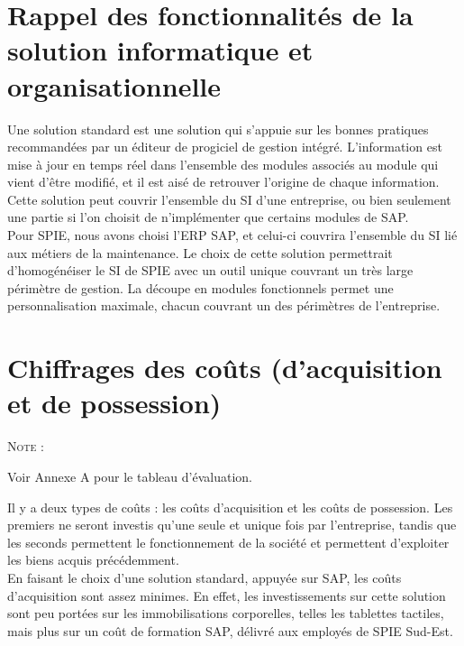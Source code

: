 \section{Rappel des fonctionnalités de la solution informatique et organisationnelle}

Une solution standard est une solution qui s’appuie sur les bonnes pratiques recommandées par un éditeur de progiciel de gestion intégré. L’information est mise à jour en temps réel dans l’ensemble des modules associés au module qui vient d’être modifié, et il est aisé de retrouver l’origine de chaque information. Cette solution peut couvrir l’ensemble du SI d’une entreprise, ou bien seulement une partie si l’on choisit de n’implémenter que certains modules de SAP. \\

Pour SPIE, nous avons choisi l’ERP SAP, et celui-ci couvrira l’ensemble du SI lié aux métiers de la maintenance. Le choix de cette solution permettrait d’homogénéiser le SI de SPIE avec un outil unique couvrant un très large périmètre de gestion. La découpe en modules fonctionnels permet une personnalisation maximale, chacun couvrant un des périmètres de l’entreprise.

\section{Chiffrages des coûts (d'acquisition et de possession)}

\begin{shaded}
\noindent\textsc{Note :} 

Voir Annexe A pour le tableau d'évaluation.
\end{shaded}

Il y a deux types de coûts : les coûts d’acquisition et les coûts de possession. Les premiers ne seront investis qu’une seule et unique fois par l’entreprise, tandis que les seconds permettent le fonctionnement de la société et permettent d’exploiter les biens acquis précédemment. \\

En faisant le choix d’une solution standard, appuyée sur SAP, les coûts d’acquisition sont assez minimes. En effet, les investissements sur cette solution sont peu portées sur les immobilisations corporelles, telles les tablettes tactiles, mais plus sur un coût de formation SAP, délivré aux employés de SPIE Sud-Est. \\

